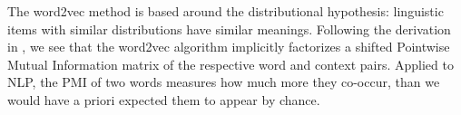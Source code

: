 The word2vec method is based around the distributional hypothesis: 
linguistic items with similar distributions have similar meanings.
Following the derivation in \cite{Levy2014Factorization}, 
we see that the word2vec algorithm implicitly factorizes a shifted Pointwise Mutual Information matrix of the respective word and context pairs.
Applied to NLP, the PMI of two words measures how much more they co-occur, than we would have a priori expected them to appear by chance.